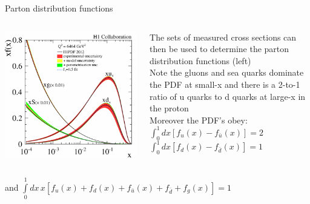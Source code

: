 \documentclass[svgnames]{beamer}
\begin{document}
\begin{frame}{Parton distribution functions}
    \begin{columns}
    \begin{column}{0.5\textwidth}
        \includegraphics[width=\columnwidth]{PDF}
    \end{column}
    \begin{column}{0.5\textwidth}
    The sets of measured cross sections can then be used to determine the parton distribution functions (left) \bigskip \\
    Note the gluons and sea quarks dominate the PDF at small-x and there is a 2-to-1 ratio of u quarks to d quarks at large-x in the proton \bigskip \\
    Moreover the PDF's obey: \\
    $\int_0^1 dx [f_u(x) - f_{\bar{u}}(x)] = 2$ \\
    $\int_0^1 dx [f_d(x) - f_{\bar{d}}(x)] = 1$ \\
    \end{column}
    \end{columns}
    \bigskip \centering
    and $\int\limits_0^1 dx\, x[f_u(x) + f_d(x) + f_{\bar{u}}(x) + f_{\bar{d}} + f_g(x)] = 1$
\end{frame}
\end{document}
